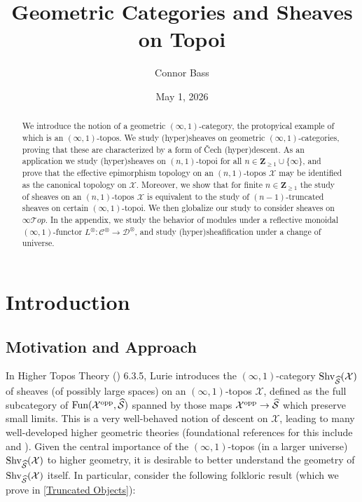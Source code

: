 \documentclass[10pt]{article}
\title{Geometric Categories and Sheaves on Topoi}
\author{Connor Bass}
\date{May 1, 2026}
\newcommand{\mS}{\mathcal S}
\newcommand{\C}{\mathcal C}
\newcommand{\cD}{\mathcal{D}}
\newcommand{\cT}{\mathcal{T}}
\newcommand{\cX}{\mathcal{X}}
\newcommand{\ZZ}{\mathbb{Z}}
\def\ZZ{{\mathbf Z}}
\theoremstyle{witharg}
\theoremstyle{witharg}
\theoremstyle{witharg2}
\begin{document}
\maketitle



\begin{abstract}

    We introduce the notion of a geometric $(\infty,1)$-category, the protopyical example of which is an $(\infty,1)$-topos. We study (hyper)sheaves on geometric $(\infty,1)$-categories, proving that these are characterized by a form of \v{C}ech (hyper)descent. As an application we study (hyper)sheaves on $(n,1)$-topoi for all $n\in \ZZ_{\geq 1}\cup \{\infty\}$, and prove that the effective epimorphism topology on an $(n,1)$-topos $\cX$ may be identified as the canonical topology on $\cX$. Moreover, we show that for finite $n\in \ZZ_{\geq 1}$ the study of sheaves on an $(n,1)$-topos $\cX$ is equivalent to the study of $(n-1)$-truncated sheaves on certain $(\infty,1)$-topoi. We then globalize our study to consider sheaves on $\infty\cT op$. In the appendix, we study the behavior of modules under a reflective monoidal $(\infty,1)$-functor $L^\otimes:\C^{\otimes}\rightarrow \cD^{\otimes}$, and study (hyper)sheafification under a change of universe.
    
\end{abstract}


\vspace{-10pt}


\tableofcontents




\section{Introduction}


\subsection{Motivation and Approach}\label{Motivation}


In Higher Topos Theory () 6.3.5, Lurie introduces the $(\infty,1)$-category $\textnormal{Shv}_{\widehat{\mS}}(\cX)$ of sheaves (of possibly large spaces) on an $(\infty,1)$-topos $\cX$, defined as the full subcategory of $\textnormal{Fun}(\cX^{\textnormal{opp}},\widehat{\mS})$ spanned by those maps $\cX^{\textnormal{opp}}\rightarrow \widehat{\mS}$ which preserve small limits. This is a very well-behaved notion of descent on $\cX$, leading to many well-developed higher geometric theories (foundational references for this include  and ). Given the central importance of the $(\infty,1)$-topos (in a larger universe) $\textnormal{Shv}_{\widehat{\mS}}(\cX)$ to higher geometry, it is desirable to better understand the geometry of $\textnormal{Shv}_{\widehat{\mS}}(\cX)$ itself. In particular, consider the following folkloric result (which we prove in \ref{Truncated Objects}):
\end{document}
